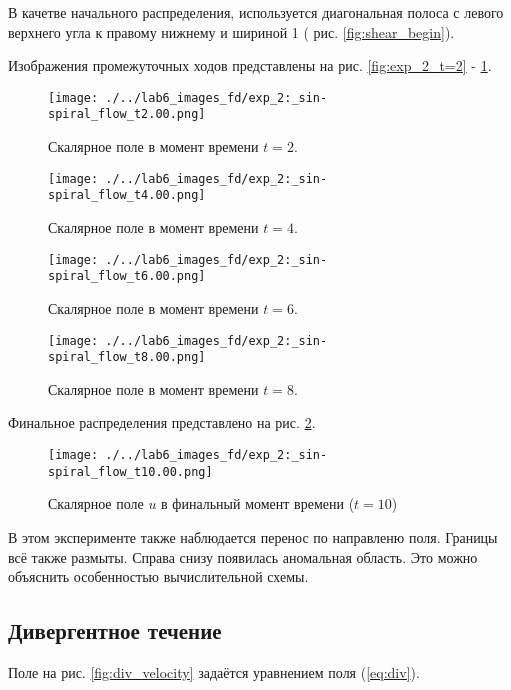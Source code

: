 В качетве начального распределения, используется диагональная  полоса  с левого верхнего угла к правому нижнему  и шириной 1 ( рис. \ref{fig:shear_begin}).


Изображения промежуточных ходов представлены на рис. \ref{fig:exp_2_t=2} - \ref{fig:exp_2_t=8}.

\begin{figure}
	\centering
	\begin{minipage}[b]{0.48\textwidth}
		\centering
		\texttt{[image: ./../lab6\_images\_fd/exp\_2:\_sin-spiral\_flow\_t2.00.png]}
		\caption{Скалярное поле в момент времени $t=2$.}
		\label{fig:exp_2_t=2}
	\end{minipage}
	\hfill
	\begin{minipage}[b]{0.48\textwidth}
		\centering
		\texttt{[image: ./../lab6\_images\_fd/exp\_2:\_sin-spiral\_flow\_t4.00.png]}
		\caption{Скалярное поле в момент времени $t=4$.}
	\end{minipage}
	\vspace{0.5cm}
	
	\begin{minipage}[b]{0.48\textwidth}
		\centering
		\texttt{[image: ./../lab6\_images\_fd/exp\_2:\_sin-spiral\_flow\_t6.00.png]}
		\caption{Скалярное поле в момент времени $t=6$.}
	\end{minipage}
	\hfill
	\begin{minipage}[b]{0.48\textwidth}
		\centering
		\texttt{[image: ./../lab6\_images\_fd/exp\_2:\_sin-spiral\_flow\_t8.00.png]}
		\caption{Скалярное поле в момент времени $t=8$.}
				\label{fig:exp_2_t=8}
	\end{minipage}
\end{figure}

\newpage
Финальное распределения представлено на рис. \ref{fig:shear_final}.

\begin{figure}
	\centering
	\texttt{[image: ./../lab6\_images\_fd/exp\_2:\_sin-spiral\_flow\_t10.00.png]}
	\caption{Скалярное поле \(u\) в финальный момент времени ($t=10$)}
	\label{fig:shear_final}
\end{figure}
В этом эксперименте также наблюдается перенос по направленю поля. Границы всё также размыты.
Справа снизу появилась аномальная область. Это можно объяснить особенностью вычислительной схемы.

\newpage
\subsection{Дивергентное течение}
Поле на рис. \ref{fig:div_velocity} задаётся уравнением поля (\ref{eq:div}).

